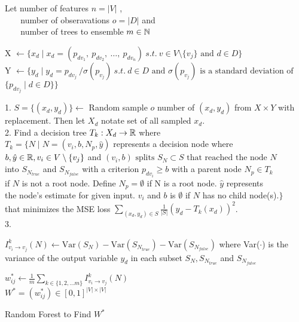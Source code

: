\clearpage
\begin{algorithm}[H]
    \DontPrintSemicolon

    Let number of features $n = |V|$ , \\
    $\:\:\:\:\:\:\:$ number of obseravations $o = |D|$ and \\
    $\:\:\:\:\:\:\:$ number of trees to ensemble $ m \in \Bbb N$

     {
        X $\gets \{ x_d \mid x_d = (p_{dv_1},\: p_{dv_2},\: \ldots, \:p_{dv_{n}}) \: s.t. \: v \in V \setminus{\{v_j\}} \text{ and } d \in D \} \:$  \\
        Y $\gets \{ y_d  \mid y_d = p_{dv_j} \: / \sigma(p_{v_j}) \: s.t. \: d \in D \text{ and } \sigma(p_{v_j}) \text{ is a standard deviation of }$ \\
        $\{ p_{dv_j} \mid d \in D \} \}$\\

         {
            1. $S = \{(x_d, y_d)\} \gets $ Random sample $o$ number of $(x_d, y_d)$ from $X \times Y$ with replacement. Then let $X_d$ notate set of all sampled $x_d$. \\
            2. Find a decision tree $T_k: X_d \to \Bbb R$ where\\
            $T_k = \{ N \mid N = (v_i, b, N_p, \hat{y}) $ represents a decision node where \\ 
            $ b, \hat{y} \in \Bbb R, v_i \in V \setminus{\{v_j\}} $ and $(v_i, b) \text{ splits } S_N \subset S \text{ that reached the node } N $\\
            into $S_{N_{true}}$ and $S_{N_{false}}$ with a criterion $p_{dv_i} \ge b$ with a parent node $ N_p \in T_k$ \\             if $N$ is not a root node. Define $N_p = \emptyset$ if N is a root node. $\hat{y}$ represents \\
            the node's estimate for given input. $v_i$ and $b$ is $\emptyset$ if $N$ has no child node(s).$\}$\\
            that minimizes the MSE loss $\sum_{(x_d, y_d) \in S} \frac{1}{|S|}(y_d - T_k(x_d))^2$.\\
            3.
             {
                {
                    $I^k_{v_i \to v_j}(N) \gets \text{Var}(S_N) - \text{Var}(S_{N_{true}}) - \text{Var}(S_{N_{false}})$ where Var($\cdot$) is the variance
                    of the output variable $y_d$ in each subset $S_N, S_{N_{true}}$ and $S_{N_{false}}$           
                } 

            }
    
        }
    }
     $w^*_{ij} \gets \frac{1}{m}\sum_{k \in \{ 1, 2, ... m\}} I^k_{v_i \to v_j}(N)$ \\
     $W^* = (w^*_{ij}) \in [0,1]^{|V| \times |V|}$
    \caption{Random Forest to Find $W^*$}
\end{algorithm}